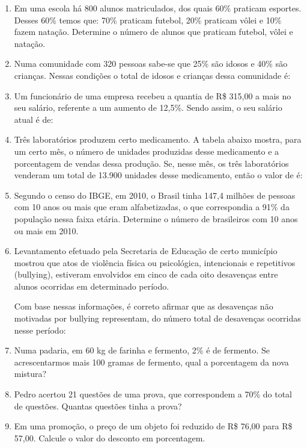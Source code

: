\documentclass[twocolumn,oneside,a4paper,12pt]{article}
\begin{document}
\begin{enumerate}
\item Em uma escola há 800 alunos matriculados, dos quais 60\% praticam esportes. Desses 60\% temos que: 70\% praticam futebol, 20\% praticam vôlei e 10\% fazem natação. Determine o número de alunos que praticam futebol, vôlei e natação.

\item Numa comunidade com 320 pessoas sabe-se que 25\% são idosos e 40\% são crianças. Nessas condições o total de idosos e crianças dessa comunidade é: 

\item Um funcionário de uma empresa recebeu a quantia de R\$ 315,00 a mais no seu salário, referente a um aumento de 12,5\%. Sendo assim, o seu salário atual é de:

\item Três laboratórios produzem certo medicamento. A tabela abaixo mostra, para um certo mês, o número de unidades produzidas desse medicamento e a porcentagem de vendas dessa produção.
Se, nesse mês, os três laboratórios venderam um total de 13.900 unidades desse medicamento, então o valor de  é:

\item Segundo o censo do IBGE, em 2010, o Brasil tinha   147,4  milhões   de   pessoas   com   10 anos ou mais que eram alfabetizadas, o que correspondia  a  91\%  da  população  nessa faixa    etária.    Determine    o    número    de brasileiros com 10 anos ou mais em 2010.

\item Levantamento efetuado pela Secretaria de Educação de certo município mostrou que atos de violência física ou psicológica, intencionais e repetitivos (bullying), estiveram envolvidos em cinco de cada oito desavenças entre alunos ocorridas em determinado período.

Com base nessas informações, é correto afirmar que as desavenças não motivadas por bullying representam, do número total de desavenças ocorridas nesse período:

\item Numa padaria, em 60 kg de farinha e fermento, 2\% é de fermento. Se acrescentarmos mais 100 gramas de fermento, qual a porcentagem da nova mistura?

\item Pedro acertou 21 questões de uma prova, que correspondem a 70\% do total de questões. Quantas questões tinha a prova?

\item Em uma promoção, o preço de um objeto foi reduzido de R\$ 76,00 para R\$ 57,00. Calcule o valor do desconto em porcentagem.


\end{enumerate}
\end{document}
